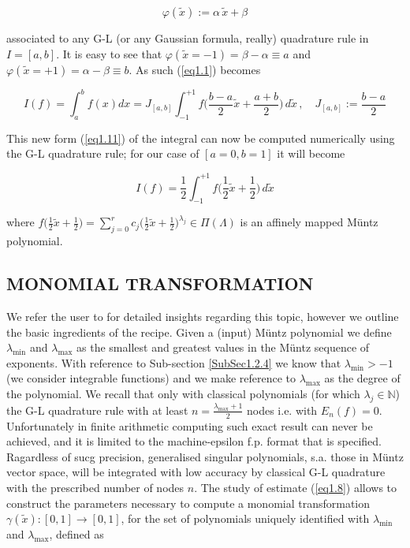\documentclass[a4paper, twosided]{book}
\begin{document}
\begin{equation}\label{eq1.10}
    \varphi(\tilde{x}) := \alpha\,\tilde{x} + \beta 
\end{equation}

\noindent
associated to any G-L (or any Gaussian formula, really) quadrature rule in $I=[a,b]$. It is easy to see that $\varphi(\tilde{x}=-1)=\beta-\alpha\equiv a$ and $\varphi(\tilde{x}=+1)=\alpha-\beta\equiv b$. As such (\ref{eq1.1}) becomes

\begin{equation}\label{eq1.11}
    I(f) = \int_a^b f(x) dx = J_{[a,b]}\int_{-1}^{+1} f\Big(\frac{b-a}{2}\tilde{x}+\frac{a+b}{2}\Big)\,d\tilde{x}\,,\quad J_{[a,b]}:=\frac{b-a}{2}
\end{equation}

\noindent
This new form (\ref{eq1.11}) of the integral can now be computed numerically using the G-L quadrature rule; for our case of $[a=0,b=1]$ it will become

\begin{equation}\label{eq1.12}
    I(f) = \frac{1}{2}\int_{-1}^{+1}f\Big(\frac{1}{2}\tilde{x}+\frac{1}{2}\Big)\,d\tilde{x}
\end{equation}

\noindent
where $f\Big(\frac{1}{2}\tilde{x}+\frac{1}{2}\Big) = \sum_{j=0}^{r}c_j\Big(\frac{1}{2}\tilde{x}+\frac{1}{2}\Big)^{\lambda_j}\in\Pi(\Lambda)$ is an affinely mapped Müntz polynomial. 

\subsection[Monomial transformation]{\changefont MONOMIAL TRANSFORMATION}\label{SubSec1.2.6}

We refer the user to \cite{Lombardi09,Lombardi21} for detailed insights regarding this topic, however we outline the basic ingredients of the recipe. Given a (input) Müntz polynomial we define $\lambda_{\text{min}}$ and $\lambda_{\text{max}}$ as the smallest and greatest values in the Müntz sequence of exponents. With reference to Sub-section \ref{SubSec1.2.4} we know that $\lambda_{\text{min}}>-1$ (we consider integrable functions) and we make reference to $\lambda_{\text{max}}$ as the degree of the polynomial. We recall that only with classical polynomials (for which $\lambda_j\in\mathbb{N}$) the G-L quadrature rule with at least $n = \frac{\lambda_{\text{max}}+1}{2}$ nodes i.e. with $E_n(f)=0$. Unfortunately in finite arithmetic computing such exact result can never be achieved, and it is limited to the machine-epsilon f.p. format that is specified. Ragardless of sucg precision, generalised singular polynomials, s.a. those in Müntz vector space, will be integrated with low accuracy by classical G-L quadrature with the prescribed number of nodes $n$. The study of estimate (\ref{eq1.8}) allows to construct the parameters necessary to compute a monomial transformation $\gamma(\tilde{x}):[0,1]\to[0,1]$, for the set of polynomials uniquely identified with $\lambda_{\text{min}}$ and $\lambda_{\text{max}}$, defined as
\end{document}
